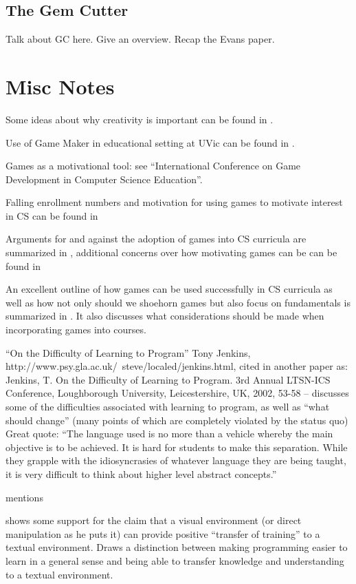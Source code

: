 \subsection{The Gem Cutter}

Talk about GC here.  Give an overview.  Recap the Evans paper.



\section{Misc Notes}

Some ideas about why creativity is important can be found in \cite{Farooq06}.

Use of Game Maker in educational setting at UVic can be found in \cite{Gooch08}.

Games as a motivational tool: see ``International Conference on Game Development in Computer Science Education''.

Falling enrollment numbers and motivation for using games to motivate interest in CS can be found in \cite{Barnes08}

Arguments for and against the adoption of games into CS curricula are summarized in \cite{Walker03}, additional concerns over how motivating games can be can be found in \cite{DiSalvo09}

An excellent outline of how games can be used successfully in CS curricula as well as how not only should we shoehorn games but also focus on fundamentals is summarized in \cite{Bayliss09}.  It also discusses what considerations should be made when incorporating games into courses.

``On the Difficulty of Learning to Program'' Tony Jenkins, http://www.psy.gla.ac.uk/~steve/localed/jenkins.html, cited in another paper as:
Jenkins, T. On the Difficulty of Learning to Program. 3rd Annual LTSN-ICS Conference, Loughborough University, Leicestershire, UK, 2002, 53-58 -- discusses some of the difficulties associated with learning to program, as well as ``what should change'' (many points of which are completely violated by the status quo)  Great quote: ``The language used is no more than a vehicle whereby the main objective is to be achieved. It is hard for students to make this separation. While they grapple with the idiosyncrasies of whatever language they are being taught, it is very difficult to think about higher level abstract concepts.''

\cite{Mahmoud04} mentions 

\cite{Hundhausen09} shows some support for the claim that a visual environment (or direct manipulation as he puts it) can provide positive ``transfer of training'' to a textual environment.  Draws a distinction between making programming easier to learn in a general sense and being able to transfer knowledge and understanding to a textual environment.



